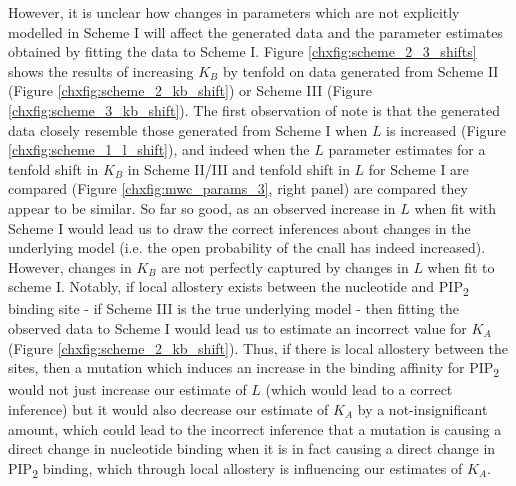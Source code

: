 However, it is unclear how changes in parameters which are not explicitly modelled in Scheme I will affect the generated data and the parameter estimates obtained by fitting the data to Scheme I.
Figure \ref{chxfig:scheme_2_3_shifts} shows the results of increasing $K_B$ by tenfold on data generated from Scheme II (Figure \ref{chxfig:scheme_2_kb_shift}) or Scheme III (Figure \ref{chxfig:scheme_3_kb_shift}).
The first observation of note is that the generated data closely resemble those generated from Scheme I when $L$ is increased (Figure \ref{chxfig:scheme_1_l_shift}), and indeed when the $L$ parameter estimates for a tenfold shift in $K_B$ in Scheme II/III and tenfold shift in $L$ for Scheme I are compared (Figure \ref{chxfig:mwc_params_3}, right panel) are compared they appear to be similar.
So far so good, as an observed increase in $L$ when fit with Scheme I would lead us to draw the correct inferences about changes in the underlying model (i.e. the open probability of the cnall has indeed increased).
However, changes in $K_B$ are not perfectly captured by changes in $L$ when fit to scheme I.
Notably, if local allostery exists between the nucleotide and PIP\textsubscript{2} binding site - if Scheme III is the true underlying model - then fitting the observed data to Scheme I would lead us to estimate an incorrect value for $K_A$ (Figure \ref{chxfig:scheme_2_kb_shift}).
Thus, if there is local allostery between the sites, then a mutation which induces an increase in the binding affinity for PIP\textsubscript{2} would not just increase our estimate of $L$ (which would lead to a correct inference) but it would also decrease our estimate of $K_A$ by a not-insignificant amount, which could lead to the incorrect inference that a mutation is causing a direct change in nucleotide binding when it is in fact causing a direct change in PIP\textsubscript{2} binding, which through local allostery is influencing our estimates of $K_A$.

